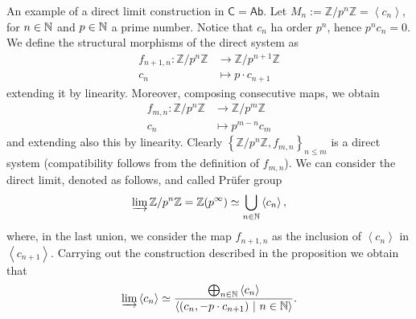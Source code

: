 \begin{ex}
	An example of a direct limit construction in $\mathsf{C} = \mathsf{Ab}$.
	Let $M_n := \mathbb{Z}/p^n\mathbb{Z} = \left\langle c_n \right\rangle$, for $n \in \mathbb{N}$ and $p \in \mathbb{N}$ a prime number.
	Notice that $c_n$ ha order $p^n$, hence $p^n c_n = 0$.
	We define the structural morphisms of the direct system as
	\begin{align}
		f_{n+1, n}: \mathbb{Z}/p^n\mathbb{Z} &\to \mathbb{Z}/p^{n+1}\mathbb{Z} \\
		c_n &\mapsto p \cdot c_{n+1}
	\end{align} 
	extending it by linearity.
	Moreover, composing consecutive maps, we obtain
	\begin{align}
		f_{m, n}: \mathbb{Z}/p^n\mathbb{Z} &\to \mathbb{Z}/p^m\mathbb{Z} \\
		c_n &\mapsto p^{m-n} c_m
	\end{align} 
	and extending also this by linearity.
	Clearly $\left\{ \mathbb{Z}/p^n\mathbb{Z}, f_{m,n} \right\}_{n \leq m}$ is a direct system 
	(compatibility follows from the definition of $f_{m,n}$).
	We can consider the direct limit, denoted as follows, and called Prüfer group
	\begin{equation}
		\varinjlim \mathbb{Z}/p^n\mathbb{Z} = \mathbb{Z} (p^{\infty}) \simeq \bigcup_{n \in \mathbb{N}} \left\langle c_n \right\rangle
	,\end{equation} 
	where, in the last union, we consider the map $f_{n+1, n}$ as the inclusion of $\left\langle c_n \right\rangle$ in
	$\left\langle c_{n+1} \right\rangle$.
	Carrying out the construction described in the proposition we obtain that
	\begin{equation}
	\varinjlim \left\langle c_n \right\rangle \simeq
	\frac{\bigoplus_{n \in \mathbb{N}} \left\langle c_n \right\rangle}{\left\langle (c_n, -p \cdot c_{n+1}) \ \middle|\ n \in \mathbb{N} \right\rangle}
	.\end{equation} 
\end{ex} 


